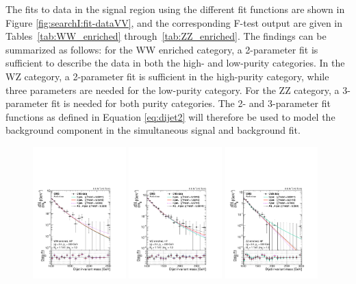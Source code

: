 The fits to data in the signal region using the different fit functions are shown in Figure \ref{fig:searchI:fit-dataVV}, and the corresponding F-test output are given in Tables~\ref{tab:WW_enriched} through~\ref{tab:ZZ_enriched}. The findings can be summarized as follows: for the WW enriched category, a 2-parameter fit is sufficient to describe the data in both the high- and low-purity categories. In the WZ category, a 2-parameter fit is sufficient in the high-purity category, while three parameters are needed for the low-purity category. For the ZZ category, a 3-parameter fit is needed for both purity categories. The 2- and 3-parameter fit functions as defined in Equation \ref{eq:dijet2} will therefore be used to model the background component in the simultaneous signal and background fit.
\begin{figure}[h!]
\centering
\includegraphics[width=0.32\textwidth]{figures/analysis/search1/AN-15-211/ftest/no5par/WWHP_fitComp.pdf}
\includegraphics[width=0.32\textwidth]{figures/analysis/search1/AN-15-211/ftest/no5par/WZHP_fitComp.pdf}
\includegraphics[width=0.32\textwidth]{figures/analysis/search1/AN-15-211/ftest/no5par/ZZHP_fitComp.pdf}\\

\end{figure}
